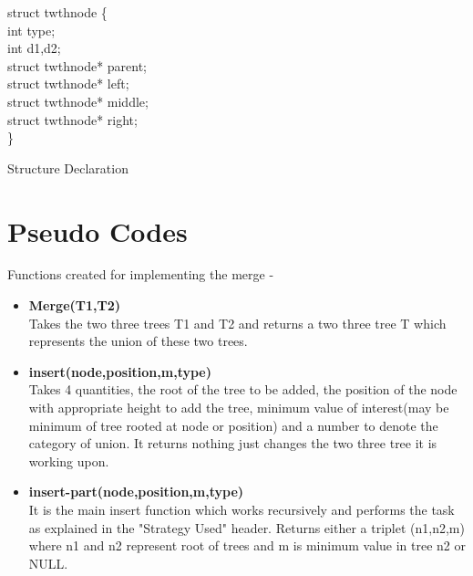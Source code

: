 \documentclass[20pt]{article}
\begin{document}
\begin{algorithm}

	struct twthnode \{ \\
		\hspace{1cm} int type; \\
		\hspace{1cm} 
		\hspace{1cm} int d1,d2; \\
		\hspace{1cm} 
		\hspace{1cm} struct twthnode* parent; \\
		\hspace{1cm} struct twthnode* left; \\
		\hspace{1cm} struct twthnode* middle; \\
		\hspace{1cm} struct twthnode* right; \\
	\}

	\caption{Structure Declaration}

\end{algorithm}

\newpage
\section{Pseudo Codes}
Functions created for implementing the merge - 

\begin{itemize}
\item \textbf{Merge(T1,T2)} \\
Takes the two three trees T1 and T2 and returns a two three tree T which represents the union of these two trees.
\item \textbf{insert(node,position,m,type)} \\
Takes 4 quantities, the root of the tree to be added, the position of the node with appropriate height to add the tree, minimum value of interest(may be minimum of tree rooted at node or position) and a number to denote the category of union. It returns nothing just changes the two three tree it is working upon.
\item \textbf{insert-part(node,position,m,type)} \\
It is the main insert function which works recursively and performs the task as explained in the "Strategy Used" header. Returns either a triplet (n1,n2,m) where n1 and n2 represent root of trees and m is minimum value in tree n2 or NULL.
\end{itemize}
\end{document}
